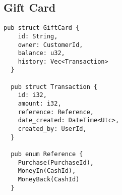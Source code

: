 \documentclass{article}
\begin{document}
\subsection{Gift Card}

\begin{lstlisting}[caption='GiftCard Object']
  pub struct GiftCard {
    id: String,
    owner: CustomerId,
    balance: u32,
    history: Vec<Transaction>
  }

  pub struct Transaction {
    id: i32,
    amount: i32,
    reference: Reference,
    date_created: DateTime<Utc>,
    created_by: UserId,
  }

  pub enum Reference {
    Purchase(PurchaseId),
    MoneyIn(CashId),
    MoneyBack(CashId)
  }
\end{lstlisting}
\end{document}
